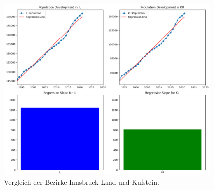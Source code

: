 \documentclass[a4paper,12pt]{article}
\begin{document}
\begin{figure}[h]
    \centering
    \includegraphics[width=\textwidth]{image-4.png}
    \caption{Vergleich der Bezirke Innsbruck-Land und Kufstein.}
    \label{fig:bezirk-vergleich}
\end{figure}
\end{document}
